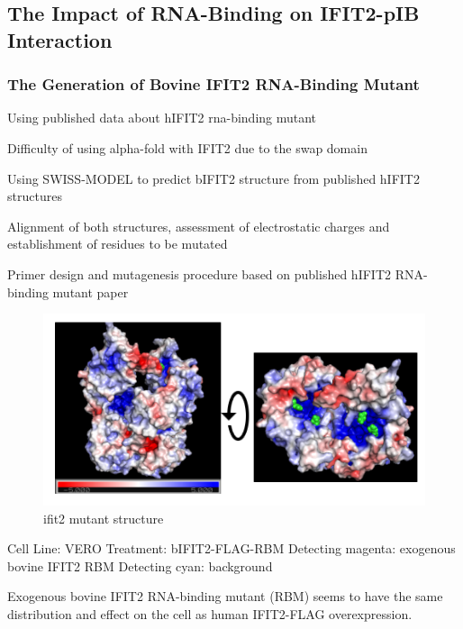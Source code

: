 \subsection{The Impact of RNA-Binding on IFIT2-pIB Interaction} \label{subsec:The Impact of RNA-Binding on IFIT2-pIB Interaction}
\subsubsection{The Generation of Bovine IFIT2 RNA-Binding Mutant} \label{The Generation of Bovine IFIT2 RNA-Binding Mutant}
Using published data about hIFIT2 rna-binding mutant

Difficulty of using alpha-fold with IFIT2 due to the swap domain

Using SWISS-MODEL to predict bIFIT2 structure from published hIFIT2 structures

Alignment of both structures, assessment of electrostatic charges and establishment of residues to be mutated

Primer design and mutagenesis procedure based on published hIFIT2 RNA-binding mutant paper

\begin{figure}
    \centering
    \includegraphics[width=1\linewidth]{10. Chapter 5/Figs/04. IFIT2-RNA binding mutant/01. structure.png}
    \caption[ifit2 mutant structure]{ifit2 mutant structure}
    \label{fig:ifit2 mutant structure}
\end{figure}

Cell Line: VERO
Treatment: bIFIT2-FLAG-RBM
Detecting magenta: exogenous bovine IFIT2 RBM
Detecting cyan: background

Exogenous bovine IFIT2 RNA-binding mutant (RBM) seems to have the same distribution and effect on the cell as human IFIT2-FLAG overexpression.

